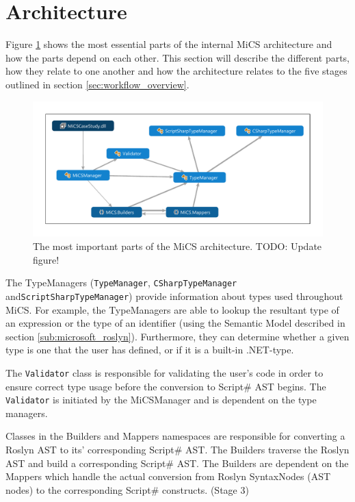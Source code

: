 \section{Architecture} %
\label{sec:architecture}
Figure \ref{fig:dependencygraph} shows the most essential parts of the internal MiCS architecture and how the parts depend on each other. 
This section will describe the different parts, how they relate to one another and how the architecture relates to the five stages outlined in section \ref{sec:workflow_overview}. 

\begin{figure}
	\begin{center}
		\centerline{\includegraphics[width=18cm]{resources/images/dependencygraph.pdf}}
	\end{center}
	\caption{The most important parts of the MiCS architecture. TODO: Update figure!}
	\label{fig:dependencygraph}
\end{figure}


The TypeManagers (\texttt{TypeManager}, \texttt{CSharpTypeManager} and\newline \texttt{ScriptSharpTypeManager}) provide information about types used throughout MiCS. For example, the TypeManagers are able to lookup the resultant type of an expression or the type of an identifier (using the Semantic Model described in section \ref{sub:microsoft_roslyn}). Furthermore, they can determine whether a given type is one that the user has defined, or if it is a built-in .NET-type.

The \texttt{Validator} class is responsible for validating the user's code in order to ensure correct type usage before the conversion to Script\# AST begins. The \texttt{Validator} is initiated by the MiCSManager and is dependent on the type managers.

Classes in the Builders and Mappers namespaces are responsible for converting a Roslyn AST to its' corresponding Script\# AST. The Builders traverse the Roslyn AST and build a corresponding Script\# AST. The Builders are dependent on the Mappers which handle the actual conversion from Roslyn SyntaxNodes (AST nodes) to the corresponding Script\# constructs. (Stage 3)

